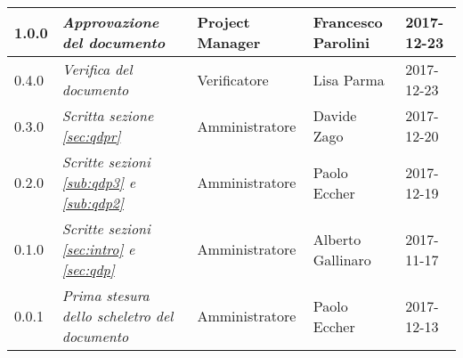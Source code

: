 \begin{table}[H]
\begin{tabular}{C{2cm}|C{4cm}|C{3cm}|C{3cm}|R{2cm}}
		1.0.0 & \emph{Approvazione del documento} & Project Manager &  Francesco Parolini & 2017-12-23 \\
		\hline
		
		0.4.0  & \emph{Verifica del documento} & Verificatore & Lisa Parma & 2017-12-23 \\
		\hline
		
		0.3.0 & \emph{Scritta sezione \ref{sec:qdpr}} & Amministratore & Davide Zago & 2017-12-20 \\
		\hline
		
		0.2.0 & \emph{Scritte sezioni \ref{sub:qdp3} e \ref{sub:qdp2}} &  Amministratore & Paolo Eccher & 2017-12-19 \\
		\hline
		
		0.1.0 & \emph{Scritte sezioni \ref{sec:intro} e \ref{sec:qdp}} & Amministratore & Alberto Gallinaro & 2017-11-17 \\
		\hline
		
		0.0.1 & \emph{Prima stesura dello scheletro del documento} & Amministratore & Paolo Eccher &  2017-12-13 \\
		
	\end{tabular}
	
\end{table}


\clearpage